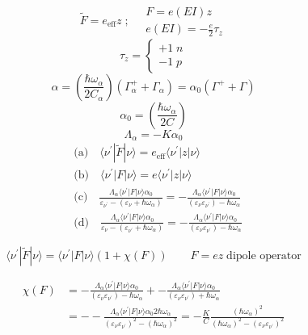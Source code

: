 \documentclass[a4paper,onecolumn,superscriptaddress,12pt,nofootinbib,twoside,raggedfooter,notitlepage]{revtex4-1}
\begin{document}
$$ \tilde{F} = e_\textrm{eff} z \;; \quad \begin{array}{l} F = e(EI) z \\ e(EI) = -\frac{e}{2} \tau_z \end{array} $$
$$ \tau_z = \begin{cases} +1\;n \\ -1\;p\end{cases} $$
$$ \alpha = \left( \frac{\hbar \omega_\alpha}{2C_\alpha} \right) \left( \Gamma_\alpha^+ + \Gamma_\alpha \right) = \alpha_0 ( \Gamma^+ + \Gamma )$$
$$ \alpha_0 = \left( \frac{\hbar \omega_\alpha}{2C} \right) $$
$$ \Lambda_\alpha = -K \alpha_0 $$
\begin{align*} 
	&\textrm{(a)} \quad \langle \nu^\prime | \tilde{F} | \nu \rangle = e_\textrm{eff} \langle \nu^\prime | z | \nu \rangle \\
	&\textrm{(b)} \quad \langle \nu^\prime | F | \nu \rangle = e \langle \nu^\prime | z | \nu \rangle \\
	&\textrm{(c)} \quad \frac{\Lambda_\alpha \langle \nu^\prime | F | \nu \rangle \alpha_0}{\varepsilon_{\nu^\prime} - \left( \varepsilon_\nu + \hbar \omega_\alpha \right)} = - \frac{\Lambda_\alpha \langle \nu^\prime | F | \nu \rangle \alpha_0}{\left( \varepsilon_\nu \varepsilon_{\nu^\prime} \right) - \hbar \omega_\alpha} \\
	&\textrm{(d)} \quad \frac{\Lambda_\alpha \langle \nu^\prime | F | \nu \rangle \alpha_0}{\varepsilon_\nu - \left( \varepsilon_{\nu^\prime} + \hbar \omega_\alpha \right)} = - \frac{\Lambda_\alpha \langle \nu^\prime | F | \nu \rangle \alpha_0}{\left( \varepsilon_\nu \varepsilon_{\nu^\prime} \right) - \hbar \omega_\alpha} 
\end{align*}

$$ \langle \nu^\prime | \tilde{F} | \nu \rangle = \langle \nu^\prime | F | \nu \rangle \left( 1+ \chi(F) \right) \qquad F = ez \; \textrm{dipole operator} $$

\begin{align*} 
	\chi(F) &= - \frac{\Lambda_\alpha \langle \nu^\prime | F | \nu \rangle \alpha_0}{\left( \varepsilon_\nu \varepsilon_{\nu^\prime} \right) - \hbar \omega_\alpha} + - \frac{\Lambda_\alpha \langle \nu^\prime | F | \nu \rangle \alpha_0}{\left( \varepsilon_\nu \varepsilon_{\nu^\prime} \right) + \hbar \omega_\alpha} \\
	&= - - \frac{\Lambda_\alpha \langle \nu^\prime | F | \nu \rangle \alpha_0 2 \hbar \omega_\alpha}{\left( \varepsilon_\nu \varepsilon_{\nu^\prime} \right)^2 - \left( \hbar \omega_\alpha \right)^2} = -\frac{K}{C} \frac{\left( \hbar \omega_\alpha \right)^2}{\left( \hbar \omega_\alpha \right)^2 - \left( \varepsilon_\nu \varepsilon_{\nu^\prime} \right)^2}
\end{align*}
\end{document}
